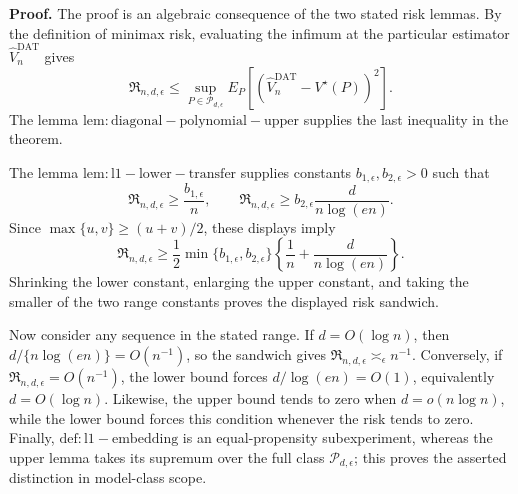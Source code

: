 \textbf{Proof.}
The proof is an algebraic consequence of the two stated risk lemmas.  By the definition of minimax risk, evaluating the infimum at the particular estimator \(\widehat V_n^{\mathrm{DAT}}\) gives
\[
 \mathfrak R_{n,d,\epsilon}
 \le
 \sup_{P\in\mathcal P_{d,\epsilon}}
 E_P[(\widehat V_n^{\mathrm{DAT}}-V^\star(P))^2].
\]
The lemma \(\mathrm{lem:diagonal-polynomial-upper}\) supplies the last inequality in the theorem.

The lemma \(\mathrm{lem:l1-lower-transfer}\) supplies constants \(b_{1,\epsilon},b_{2,\epsilon}>0\) such that
\[
 \mathfrak R_{n,d,\epsilon}\ge \frac{b_{1,\epsilon}}n,
 \qquad
 \mathfrak R_{n,d,\epsilon}\ge
 b_{2,\epsilon}\frac{d}{n\log(en)}.
\]
Since \(\max\{u,v\}\ge(u+v)/2\), these displays imply
\[
 \mathfrak R_{n,d,\epsilon}
 \ge \frac12\min\{b_{1,\epsilon},b_{2,\epsilon}\}
 \left\{\frac1n+\frac{d}{n\log(en)}\right\}.
\]
Shrinking the lower constant, enlarging the upper constant, and taking the smaller of the two range constants proves the displayed risk sandwich.

Now consider any sequence in the stated range.  If \(d=O(\log n)\), then \(d/\{n\log(en)\}=O(n^{-1})\), so the sandwich gives \(\mathfrak R_{n,d,\epsilon}\asymp_\epsilon n^{-1}\).  Conversely, if \(\mathfrak R_{n,d,\epsilon}=O(n^{-1})\), the lower bound forces \(d/\log(en)=O(1)\), equivalently \(d=O(\log n)\).  Likewise, the upper bound tends to zero when \(d=o(n\log n)\), while the lower bound forces this condition whenever the risk tends to zero.  Finally, \(\mathrm{def:l1-embedding}\) is an equal-propensity subexperiment, whereas the upper lemma takes its supremum over the full class \(\mathcal P_{d,\epsilon}\); this proves the asserted distinction in model-class scope.